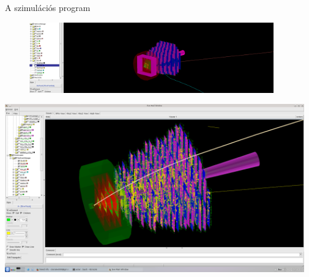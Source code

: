 \documentclass[10pt]{beamer}
\begin{document}
\begin{frame}[t]{A szimulációs program}
\begin{minipage}{\textwidth}
\begin{minipage}{0.78\textwidth}
\begin{figure}[H!]
\centering
\includegraphics[width=0.94\textwidth]{../latex/k-k+decayofphi.png}
\end{figure}
\end{minipage}
\begin{minipage}{0.72\textwidth}
\centering
\includegraphics[width=0.97\textwidth]{../latex/reco2.png}
\end{minipage}
\end{minipage}
\end{frame}
\end{document}
